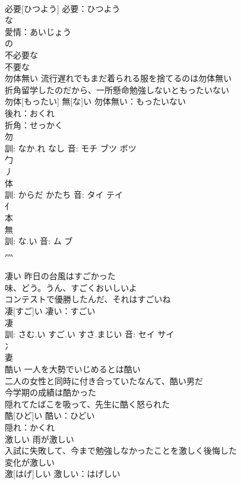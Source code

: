 \documentclass[8pt]{extreport}
\begin{document}
\begin{CJK}{UTF8}{min}
\\	必要[ひつよう]			必要：ひつよう
\\	な 
\\	愛情：あいじょう
\\	の 
\\	不必要な 
\\	不要な 
\\	勿体無い	流行遅れでもまだ着られる服を捨てるのは勿体無い 
\\	折角留学したのだから、一所懸命勉強しないともったいない 
\\	勿体[もったい] 無[な]い			勿体無い：もったいない
\\	後れ：おくれ
\\	折角：せっかく
\\	勿 
\\	訓: なか.れ なし 音: モチ ブツ ボツ 
\\	勹 
\\	丿 
\\	体 
\\	訓: からだ かたち 音: タイ テイ 
\\	亻 
\\	本 
\\	無 
\\	訓: な.い 音: ム ブ 
\\	灬 
\\	[無明]	
\\	凄い	昨日の台風はすごかった 
\\	味、どう。うん、すごくおいしいよ 
\\	コンテストで優勝したんだ、それはすごいね 
\\	凄[すご]い			凄い：すごい
\\	凄 
\\	訓: さむ.い すご.い すさ.まじい 音: セイ サイ 
\\	冫 
\\	妻 
\\	酷い	一人を大勢でいじめるとは酷い 
\\	二人の女性と同時に付き合っていたなんて、酷い男だ 
\\	今学期の成績は酷かった 
\\	隠れてたばこを吸って、先生に酷く怒られた 
\\	酷[ひど]い			酷い：ひどい
\\	隠れ：かくれ
\\	激しい	雨が激しい 
\\	入試に失敗して、今まで勉強しなかったことを激しく後悔した 
\\	変化が激しい 
\\	激[はげ]しい			激しい：はげしい

\end{CJK}
\end{document}
